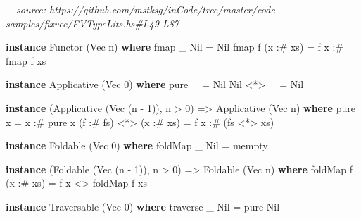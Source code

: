 \documentclass[]{article}
\newenvironment{Shaded}{}{}
\newcommand{\CommentTok}[1]{\textcolor[rgb]{0.38,0.63,0.69}{\textit{#1}}}
\newcommand{\DataTypeTok}[1]{\textcolor[rgb]{0.56,0.13,0.00}{#1}}
\newcommand{\DecValTok}[1]{\textcolor[rgb]{0.25,0.63,0.44}{#1}}
\newcommand{\FunctionTok}[1]{\textcolor[rgb]{0.02,0.16,0.49}{#1}}
\newcommand{\KeywordTok}[1]{\textcolor[rgb]{0.00,0.44,0.13}{\textbf{#1}}}
\newcommand{\NormalTok}[1]{#1}
\newcommand{\OperatorTok}[1]{\textcolor[rgb]{0.40,0.40,0.40}{#1}}
\newcommand{\OtherTok}[1]{\textcolor[rgb]{0.00,0.44,0.13}{#1}}
\begin{document}
\begin{Shaded}
\begin{Highlighting}[]
\CommentTok{{-}{-} source: https://github.com/mstksg/inCode/tree/master/code{-}samples/fixvec/FVTypeLits.hs\#L49{-}L87}

\KeywordTok{instance} \DataTypeTok{Functor}\NormalTok{ (}\DataTypeTok{Vec}\NormalTok{ n) }\KeywordTok{where}
    \FunctionTok{fmap}\NormalTok{ \_ }\DataTypeTok{Nil}       \OtherTok{=} \DataTypeTok{Nil}
    \FunctionTok{fmap}\NormalTok{ f (x }\OperatorTok{:\#}\NormalTok{ xs) }\OtherTok{=}\NormalTok{ f x }\OperatorTok{:\#} \FunctionTok{fmap}\NormalTok{ f xs}

\KeywordTok{instance} \DataTypeTok{Applicative}\NormalTok{ (}\DataTypeTok{Vec} \DecValTok{0}\NormalTok{) }\KeywordTok{where}
    \FunctionTok{pure}\NormalTok{ \_    }\OtherTok{=} \DataTypeTok{Nil}
    \DataTypeTok{Nil} \OperatorTok{\textless{}*\textgreater{}}\NormalTok{ \_ }\OtherTok{=} \DataTypeTok{Nil}

\KeywordTok{instance}\NormalTok{ (}\DataTypeTok{Applicative}\NormalTok{ (}\DataTypeTok{Vec}\NormalTok{ (n }\OperatorTok{{-}} \DecValTok{1}\NormalTok{)), n }\OperatorTok{\textgreater{}} \DecValTok{0}\NormalTok{) }\OtherTok{=\textgreater{}} \DataTypeTok{Applicative}\NormalTok{ (}\DataTypeTok{Vec}\NormalTok{ n) }\KeywordTok{where}
    \FunctionTok{pure}\NormalTok{ x }\OtherTok{=}\NormalTok{ x }\OperatorTok{:\#} \FunctionTok{pure}\NormalTok{ x}
\NormalTok{    (f }\OperatorTok{:\#}\NormalTok{ fs) }\OperatorTok{\textless{}*\textgreater{}}\NormalTok{ (x }\OperatorTok{:\#}\NormalTok{ xs) }\OtherTok{=}\NormalTok{ f x }\OperatorTok{:\#}\NormalTok{ (fs }\OperatorTok{\textless{}*\textgreater{}}\NormalTok{ xs)}

\KeywordTok{instance} \DataTypeTok{Foldable}\NormalTok{ (}\DataTypeTok{Vec} \DecValTok{0}\NormalTok{) }\KeywordTok{where}
    \FunctionTok{foldMap}\NormalTok{ \_ }\DataTypeTok{Nil} \OtherTok{=} \FunctionTok{mempty}

\KeywordTok{instance}\NormalTok{ (}\DataTypeTok{Foldable}\NormalTok{ (}\DataTypeTok{Vec}\NormalTok{ (n }\OperatorTok{{-}} \DecValTok{1}\NormalTok{)), n }\OperatorTok{\textgreater{}} \DecValTok{0}\NormalTok{) }\OtherTok{=\textgreater{}} \DataTypeTok{Foldable}\NormalTok{ (}\DataTypeTok{Vec}\NormalTok{ n) }\KeywordTok{where}
    \FunctionTok{foldMap}\NormalTok{ f (x }\OperatorTok{:\#}\NormalTok{ xs) }\OtherTok{=}\NormalTok{ f x }\OperatorTok{\textless{}\textgreater{}} \FunctionTok{foldMap}\NormalTok{ f xs}

\KeywordTok{instance} \DataTypeTok{Traversable}\NormalTok{ (}\DataTypeTok{Vec} \DecValTok{0}\NormalTok{) }\KeywordTok{where}
    \FunctionTok{traverse}\NormalTok{ \_ }\DataTypeTok{Nil} \OtherTok{=} \FunctionTok{pure} \DataTypeTok{Nil}


\end{Highlighting}
\end{Shaded}
\end{document}
